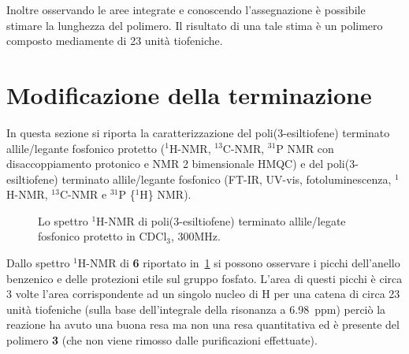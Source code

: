 Inoltre osservando le aree integrate e conoscendo l'assegnazione è possibile stimare la lunghezza del polimero. Il risultato di una tale stima è un polimero composto mediamente di 23 unità tiofeniche. 

\section{Modificazione della terminazione}
In questa sezione si riporta la caratterizzazione 
 del poli(3-esiltiofene) terminato allile/legante fosfonico protetto  ($^1$H-NMR, $^{13}$C-NMR, $^{31}$P NMR con disaccoppiamento protonico e NMR 2 bimensionale HMQC) e del poli(3-esiltiofene) terminato allile/legante fosfonico  (FT-IR, UV-vis, fotoluminescenza, $^1$H-NMR, $^{13}$C-NMR e $^{31}$P \{$^1$H\} NMR).

\begin{figure}
\vspace{-15pt}
\caption{\footnotesize{Lo spettro $^1$H-NMR di poli(3-esiltiofene) terminato allile/legate fosfonico protetto in CDCl$_3$, 300MHz.}
\label{fig:P3HT-leg-HNMR}}
\end{figure}
Dallo spettro $^1$H-NMR di {\bf 6} riportato in~\ref{fig:P3HT-leg-HNMR} si possono osservare i picchi dell'anello benzenico e delle protezioni etile sul gruppo fosfato. L'area di questi picchi è circa 3 volte l'area corrispondente ad un singolo nucleo di H per una catena di circa 23 unità tiofeniche (sulla base dell'integrale della risonanza a 6.98~ppm) perciò la reazione ha avuto una buona resa ma non una resa quantitativa ed è presente del polimero {\bf 3} (che non viene rimosso dalle purificazioni effettuate). 

